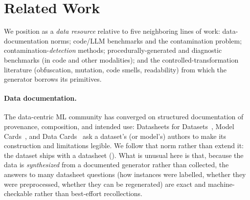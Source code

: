 
\section{Related Work}
\label{sec:related}

We position \tool{} as a \emph{data resource} relative to five neighboring lines of work:
data-documentation norms; code/LLM benchmarks and the contamination problem;
contamination-\emph{detection} methods; procedurally-generated and diagnostic benchmarks
(in code and other modalities); and the controlled-transformation literature (obfuscation,
mutation, code smells, readability) from which the generator borrows its primitives.

\paragraph{Data documentation.} The data-centric ML community has converged on
structured documentation of provenance, composition, and intended use: Datasheets for
Datasets~\citep{gebru2021datasheets}, Model Cards~\citep{mitchell2019model}, and Data
Cards~\citep{pushkarna2022datacards} ask a dataset's (or model's) authors to make its
construction and limitations legible. We follow that norm rather than extend it: the dataset ships with a
datasheet (). What is unusual here is that, because the data is
\emph{synthesized} from a documented generator rather than collected, the answers to
many datasheet questions (how instances were labelled, whether they were preprocessed,
whether they can be regenerated) are exact and machine-checkable rather than
best-effort recollections.

